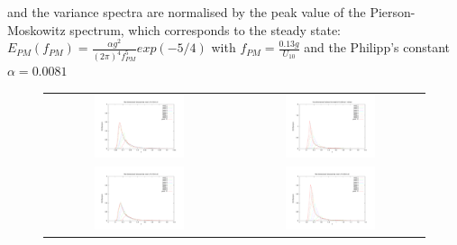 and the variance spectra are normalised by the peak value of the
Pierson-Moskowitz spectrum, which corresponds to the steady state:
$E_{PM}(f_{PM}) = \frac{\alpha g^2}{(2\pi)^4 f_{PM}^5} exp(-5/4)$ with
$f_{PM}=\frac{0.13 g}{U_{10}}$ and the Philipp's constant $\alpha = 0.0081$
\begin{figure}[h!]
\begin{tabular}{cc}
  \includegraphics[width=0.5\textwidth]{variance_ad_free_mesh_t1_v10.pdf} &
  \includegraphics[width=0.5\textwidth]{variance_ad_free_mesh_t1_fine_v20.pdf}\\
  \includegraphics[width=0.5\textwidth]{variance_ad_free_mesh_t2_v10.pdf} &
  \includegraphics[width=0.5\textwidth]{variance_ad_free_mesh_t2_v20.pdf}\\

\end{tabular}
\end{figure}
